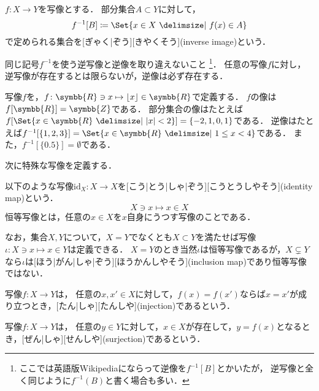 \documentclass[../sotsu.tex]{subfiles}
\begin{document}
\begin{definition}[逆像]
    $f \colon X \to Y$を写像とする．
    部分集合$A \subset Y$に対して，
    \begin{equation}
        f^{-1}[B] \coloneq \Set{  x \in X  \given  f(x) \in A  }
    \end{equation}
    で定められる集合を[ぎゃく|ぞう][きやくそう](inverse image)という．
\end{definition}
同じ記号$f^{-1}$を使う逆写像と逆像を取り違えないこと%
\footnote{
    ここでは英語版Wikipediaにならって逆像を$f^{-1}[B]$とかいたが，
    逆写像と全く同じように$f^{-1}(B)$と書く場合も多い．
}．
任意の写像$f$に対し，逆写像が存在するとは限らないが，逆像は必ず存在する．

\begin{example}
    写像$f$を，$f \colon \symbb{R} \ni x \mapsto \lfloor x \rfloor \in \symbb{R}$で定義する．
    $f$の像は$f[\symbb{R}] = \symbb{Z}$である．
    部分集合の像はたとえば$f[ \Set{  x \in \symbb{R}  \given  \abs{x} < 2  } ] = \{ -2, 1, 0, 1 \}$である．
    逆像はたとえば$f^{-1}[ \{ 1, 2, 3 \} ] = \Set{  x \in \symbb{R}  \given  1 \leq x < 4  }$である．
    また，$f^{-1}[ \{ 0.5 \} ] = \emptyset$である．
\end{example}


次に特殊な写像を定義する．

\begin{definition}[恒等写像]
    \label{dfn:identity-map}
    以下のような写像$\mathrm{id}_X \colon X \to X$を[こう|とう|しゃ|ぞう][こうとうしやそう](identity map)という．
    \[ X \ni x \mapsto x \in X \]
    恒等写像とは，任意の$x \in X$を$x$自身にうつす写像のことである．
\end{definition}

なお，集合$X, Y$について，$X = Y$でなくとも$X \subset Y$を満たせば写像$\iota \colon X \ni x \mapsto x \in Y$は定義できる．
$X = Y$のとき当然$\iota$は恒等写像であるが，$X \subsetneq Y$なら$\iota$は[ほう|がん|しゃ|ぞう][ほうかんしやそう](inclusion map)であり恒等写像ではない．

\begin{definition}[単射]
    \label{dfn:injection}
    写像$f \colon X \to Y$は，
    任意の$x, x' \in X$に対して，$f(x) = f(x')$ならば$x = x'$が成り立つとき，[たん|しゃ][たんしや](injection)であるという．
\end{definition}

\begin{definition}[全射]
    \label{dfn:surjection}
    写像$f \colon X \to Y$は，
    任意の$y \in Y$に対して，$x \in X$が存在して，$y = f(x)$となるとき，[ぜん|しゃ][せんしや](surjection)であるという．
\end{definition}
\end{document}
